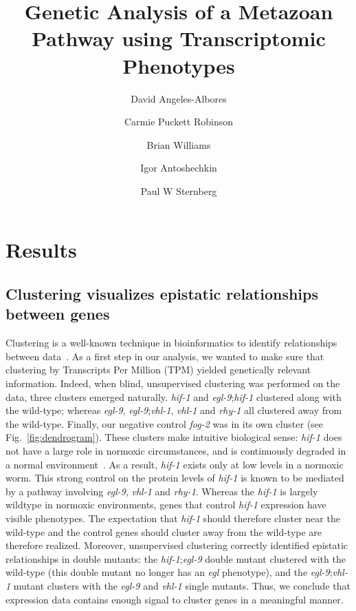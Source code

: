 \documentclass[9pt,twocolumn,twoside]{pnas-new}
\title{Genetic Analysis of a Metazoan Pathway using Transcriptomic Phenotypes}
\author[a,b]{David Angeles-Albores}
\author[a,b]{Carmie Puckett Robinson}
\author[a]{Brian Williams}
\author[a]{Igor Antoshechkin}
\author[a,b]{Paul W Sternberg}
\affil[a]{Department of Biology and Biological Engineering, Caltech, Pasadena, USA, 91125}
\affil[b]{Howard Hughes Medical Institute}
\newcommand{\egl}{\emph{egl-9}}
\newcommand{\rhy}{\emph{rhy-1}}
\newcommand{\vhl}{\emph{vhl-1}}
\newcommand{\hif}{\emph{hif-1}}
\newcommand{\fog}{\emph{fog-2}}
\begin{document}
\verticaladjustment{-2pt}

\maketitle
\thispagestyle{firststyle}


\section*{Results}
\subsection{Clustering visualizes epistatic relationships between genes}
\label{sub:Clustering}

Clustering is a well-known technique in bioinformatics to identify relationships between data~\cite{}. As a first step in our analysis, we wanted to make sure that clustering by Transcripts Per Million (TPM) yielded genetically relevant information. Indeed, when blind, unsupervised clustering was performed on the data, three clusters emerged naturally. \hif{} and \egl{};\hif{} clustered along with the wild-type; whereas \egl{}, \egl{};\vhl{}, \vhl{} and \rhy{} all clustered away from the wild-type. Finally, our negative control \fog{} was in its own cluster (see Fig.~\ref{fig:dendrogram}). These clusters make intuitive biological sense:
\hif{} does not have a large role in normoxic circumstances, and is continuously degraded in a normal environment~\cite{}. As a result, \hif{} exists only at low levels in a normoxic worm. This strong control on the protein levels of \hif{} is known to be mediated by a pathway involving \egl{}, \vhl{} and \rhy{}\cite{}. Whereas the \hif{} is largely wildtype in normoxic environments, genes that control \hif{} expression have visible phenotypes. The expectation that \hif{} should therefore cluster near the wild-type and the control genes should cluster away from the wild-type are therefore realized. Moreover, unsupervised clustering correctly identified epistatic relationships in double mutants: the \hif{};\egl{} double mutant clustered with the wild-type (this double mutant no longer has an \emph{egl} phenotype), and the \egl{};\vhl{} mutant clusters with the \egl{} and \vhl{} single mutants.
Thus, we conclude that expression data contains enough signal to cluster genes in a meaningful manner.
\end{document}
